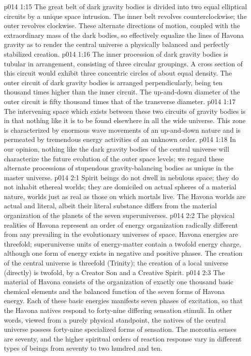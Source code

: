 \vs p014 1:15 The great belt of dark gravity bodies is divided into two equal elliptical circuits by a unique space intrusion. The inner belt revolves counterclockwise; the outer revolves clockwise. These alternate directions of motion, coupled with the extraordinary mass of the dark bodies, so effectively equalize the lines of Havona gravity as to render the central universe a physically balanced and perfectly stabilized creation.
\vs p014 1:16 The inner procession of dark gravity bodies is tubular in arrangement, consisting of three circular groupings. A cross section of this circuit would exhibit three concentric circles of about equal density. The outer circuit of dark gravity bodies is arranged perpendicularly, being ten thousand times higher than the inner circuit. The up\hyp{}and\hyp{}down diameter of the outer circuit is fifty thousand times that of the transverse diameter.
\vs p014 1:17 The intervening space which exists between these two circuits of gravity bodies is  in that nothing like it is to be found elsewhere in all the wide universe. This zone is characterized by enormous wave movements of an up\hyp{}and\hyp{}down nature and is permeated by tremendous energy activities of an unknown order.
\vs p014 1:18 In our opinion, nothing like the dark gravity bodies of the central universe will characterize the future evolution of the outer space levels; we regard these alternate processions of stupendous gravity\hyp{}balancing bodies as unique in the master universe.
\vs p014 2:1 Spirit beings do not dwell in nebulous space; they do not inhabit ethereal worlds; they are domiciled on actual spheres of a material nature, worlds just as real as those on which mortals live. The Havona worlds are actual and literal, albeit their literal substance differs from the material organization of the planets of the seven superuniverses.
\vs p014 2:2 The physical realities of Havona represent an order of energy organization radically different from any prevailing in the evolutionary universes of space. Havona energies are threefold; superuniverse units of energy\hyp{}matter contain a twofold energy charge, although one form of energy exists in negative and positive phases. The creation of the central universe is threefold (Trinity); the creation of a local universe (directly) is twofold, by a Creator Son and a Creative Spirit.
\vs p014 2:3 The material of Havona consists of the organization of exactly one thousand basic chemical elements and the balanced function of the seven forms of Havona energy. Each of these basic energies manifests seven phases of excitation, so that the Havona natives respond to forty\hyp{}nine differing sensation stimuli. In other words, viewed from a purely physical standpoint, the natives of the central universe possess forty\hyp{}nine specialized forms of sensation. The morontia senses are seventy, and the higher spiritual orders of reaction response vary in different types of beings from seventy to two hundred and ten.

